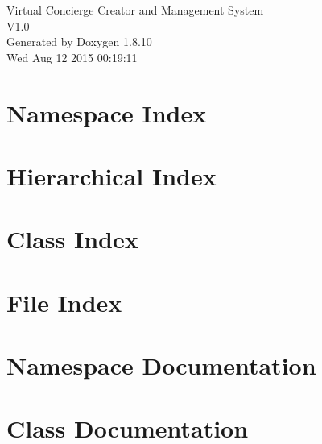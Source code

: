 \documentclass[twoside]{book}
\newcommand{\+}{\discretionary{\mbox{\scriptsize$\hookleftarrow$}}{}{}}
\newcommand{\clearemptydoublepage}{%
  \newpage{\pagestyle{empty}\cleardoublepage}%
}
\begin{document}
\hypersetup{pageanchor=false,
             bookmarks=true,
             bookmarksnumbered=true,
             pdfencoding=unicode
            }
\begin{titlepage}
\vspace*{7cm}
\begin{center}%
{\Large Virtual Concierge Creator and Management System \\[1ex]\large V1.\+0 }\\
\vspace*{1cm}
{\large Generated by Doxygen 1.8.10}\\
\vspace*{0.5cm}
{\small Wed Aug 12 2015 00:19:11}\\
\end{center}
\end{titlepage}
\clearemptydoublepage
\tableofcontents
\clearemptydoublepage
{}
\hypersetup{pageanchor=true}

\chapter{Namespace Index}

\chapter{Hierarchical Index}

\chapter{Class Index}

\chapter{File Index}

\chapter{Namespace Documentation}

\chapter{Class Documentation}














\end{document}
